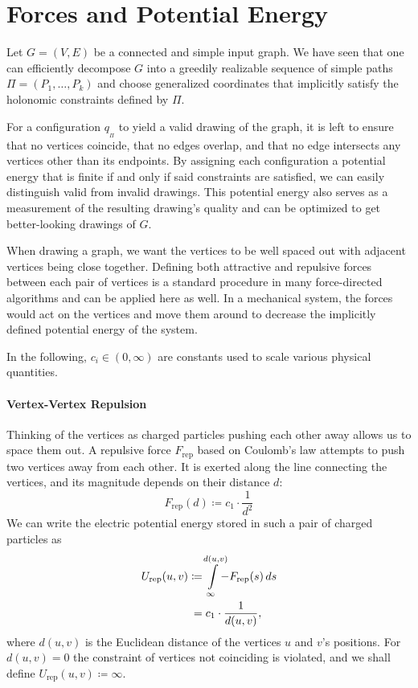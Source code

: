 \section{Forces and Potential Energy}
\label{sect:forces-and-potential-energy}

Let ${G = (V, E)}$ be a connected and simple input graph. We have seen that one can efficiently decompose ${G}$ into a greedily realizable sequence of simple paths ${\Pi = (P_1, \ldots, P_k)}$ and choose generalized coordinates that implicitly satisfy the holonomic constraints defined by ${\Pi}$.

For a configuration ${q_{_\Pi}}$ to yield a valid drawing of the graph, it is left to ensure that no vertices coincide, that no edges overlap, and that no edge intersects any vertices other than its endpoints. By assigning each configuration a potential energy that is finite if and only if said constraints are satisfied, we can easily distinguish valid from invalid drawings. This potential energy also serves as a measurement of the resulting drawing's quality and can be optimized to get better-looking drawings of ${G}$.

When drawing a graph, we want the vertices to be well spaced out with adjacent vertices being close together. Defining both attractive and repulsive forces between each pair of vertices is a standard procedure in many force-directed algorithms \cite{Kobourov} and can be applied here as well. In a mechanical system, the forces would act on the vertices and move them around to decrease the implicitly defined potential energy of the system.

In the following, ${c_i \in (0, \infty)}$ are constants used to scale various physical quantities.





\paragraph{Vertex-Vertex Repulsion}

Thinking of the vertices as charged particles pushing each other away allows us to space them out. A repulsive force ${F_\text{rep}}$ based on Coulomb's law attempts to push two vertices away from each other. It is exerted along the line connecting the vertices, and its magnitude depends on their distance ${d}$:
%
\begin{equation*}
  F_\text{rep}(d) \coloneqq c_1 \cdot \frac{1}{d^2}
\end{equation*}
%
We can write the electric potential energy stored in such a pair of charged particles as
%
\begin{align*}
  U_\text{rep}(u, v) \coloneqq{}& \int\limits_{\infty}^{\mathclap{d(u, v)}} -F_\text{rep}(s) \differential{s}
  \\
  ={}& c_1 \cdot \frac{1}{d(u, v)},
\end{align*}
%
where ${d(u, v)}$ is the Euclidean distance of the vertices ${u}$ and ${v}$'s positions. For ${d(u, v) = 0}$ the constraint of vertices not coinciding is violated, and we shall define ${U_\text{rep}(u, v) \coloneqq \infty}$.





